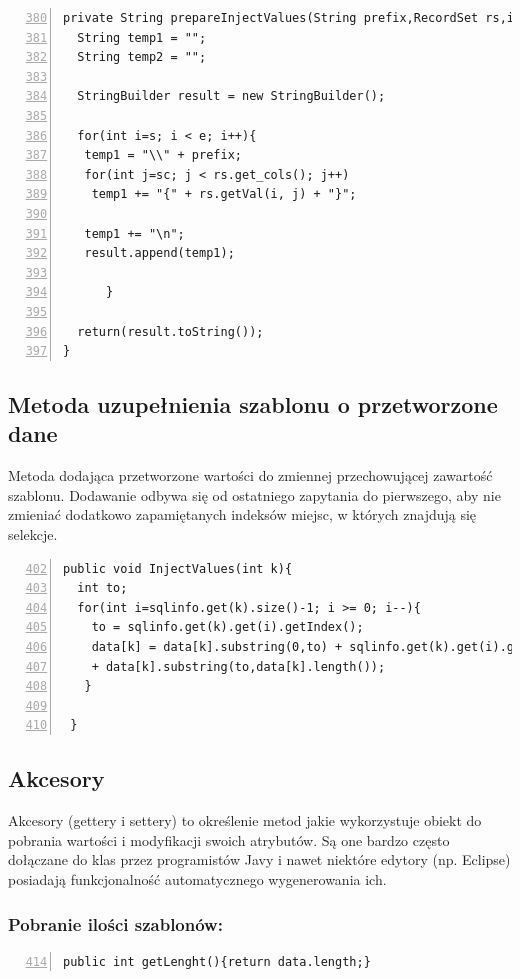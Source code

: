  \begin{lstlisting}[numbers=left,firstnumber=380]
 private String prepareInjectValues(String prefix,RecordSet rs,int s, int e,int sc){
  String temp1 = "";
  String temp2 = "";

  StringBuilder result = new StringBuilder();

  for(int i=s; i < e; i++){
   temp1 = "\\" + prefix;
   for(int j=sc; j < rs.get_cols(); j++)
    temp1 += "{" + rs.getVal(i, j) + "}";

   temp1 += "\n";
   result.append(temp1);

      }

  return(result.toString());
}    
\end{lstlisting}


\subsection{Metoda uzupełnienia szablonu o przetworzone dane}

Metoda dodająca przetworzone wartości do zmiennej przechowującej zawartość szablonu. Dodawanie odbywa się od ostatniego zapytania do pierwszego, aby nie zmieniać dodatkowo zapamiętanych indeksów miejsc, w których znajdują się selekcje.

 \begin{lstlisting}[numbers=left,firstnumber=402]
 public void InjectValues(int k){
  int to;
  for(int i=sqlinfo.get(k).size()-1; i >= 0; i--){
    to = sqlinfo.get(k).get(i).getIndex();
    data[k] = data[k].substring(0,to) + sqlinfo.get(k).get(i).getData() 
    + data[k].substring(to,data[k].length());
   }
        
 }
\end{lstlisting}


\subsection{Akcesory}
Akcesory (gettery i settery) to określenie metod jakie wykorzystuje obiekt do pobrania wartości i modyfikacji swoich atrybutów. Są one bardzo często dołączane do klas przez programistów Javy i nawet niektóre edytory (np. Eclipse) posiadają funkcjonalność automatycznego wygenerowania ich.

\subsubsection*{Pobranie ilości szablonów:}
 \begin{lstlisting}[numbers=left,firstnumber=414]
 public int getLenght(){return data.length;}
 \end{lstlisting}
 

